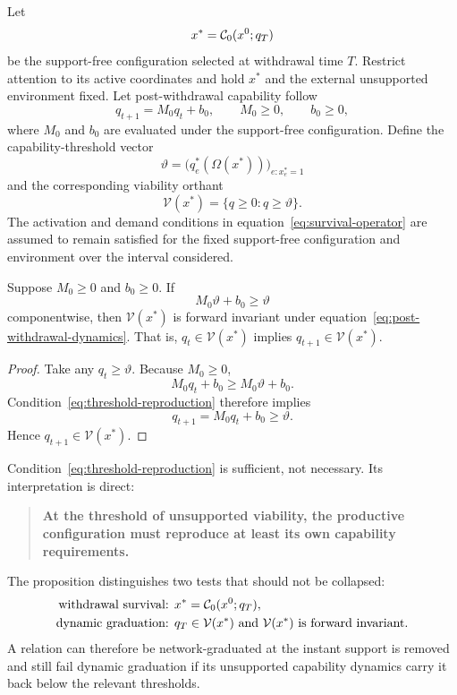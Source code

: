 Let
\begin{equation}
x^*=\mathcal{C}_0(x^0;q_T)
\end{equation}
be the support-free configuration selected at withdrawal time $T$. Restrict attention to its active coordinates and hold $x^*$ and the external unsupported environment fixed. Let post-withdrawal capability follow
\begin{equation}
q_{t+1}=M_0q_t+b_0,
\qquad M_0\ge0,
\qquad b_0\ge0,
\label{eq:post-withdrawal-dynamics}
\end{equation}
where $M_0$ and $b_0$ are evaluated under the support-free configuration. Define the capability-threshold vector
\begin{equation}
\vartheta
=
\bigl(q_e^*(\Omega(x^*))\bigr)_{e:x_e^*=1}
\end{equation}
and the corresponding viability orthant
\begin{equation}
\mathcal V(x^*)
=
\{q\ge0:q\ge\vartheta\}.
\label{eq:viability-orthant}
\end{equation}
The activation and demand conditions in equation~\eqref{eq:survival-operator} are assumed to remain satisfied for the fixed support-free configuration and environment over the interval considered.

\begin{proposition}
\label{prop:forward-invariance}
Suppose $M_0\ge0$ and $b_0\ge0$. If
\begin{equation}
M_0\vartheta+b_0\ge\vartheta
\label{eq:threshold-reproduction}
\end{equation}
componentwise, then $\mathcal V(x^*)$ is forward invariant under equation~\eqref{eq:post-withdrawal-dynamics}. That is, $q_t\in\mathcal V(x^*)$ implies $q_{t+1}\in\mathcal V(x^*)$.
\end{proposition}

\begin{proof}
Take any $q_t\ge\vartheta$. Because $M_0\ge0$,
\[
M_0q_t+b_0
\ge
M_0\vartheta+b_0.
\]
Condition~\eqref{eq:threshold-reproduction} therefore implies
\[
q_{t+1}=M_0q_t+b_0\ge\vartheta.
\]
Hence $q_{t+1}\in\mathcal V(x^*)$.
\end{proof}

Condition~\eqref{eq:threshold-reproduction} is sufficient, not necessary. Its interpretation is direct:
\begin{quote}
\textbf{At the threshold of unsupported viability, the productive configuration must reproduce at least its own capability requirements.}
\end{quote}
The proposition distinguishes two tests that should not be collapsed:
\begin{align*}
\text{withdrawal survival: }&x^*=\mathcal{C}_0(x^0;q_T),\\
\text{dynamic graduation: }&q_T\in\mathcal V(x^*)\text{ and }\mathcal V(x^*)\text{ is forward invariant.}
\end{align*}
A relation can therefore be network-graduated at the instant support is removed and still fail dynamic graduation if its unsupported capability dynamics carry it back below the relevant thresholds.

